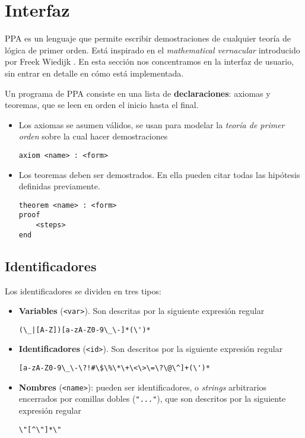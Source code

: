\section{Interfaz}

PPA es un lenguaje que permite escribir demostraciones de cualquier teoría de
lógica de primer orden. Está inspirado en el \textit{mathematical vernacular}
introducido por Freek Wiedijk \cite{freek-mv}. En esta sección nos
concentramos en la interfaz de usuario, sin entrar en detalle en cómo está
implementada.

Un programa de PPA consiste en una lista de \textbf{declaraciones}: axiomas y
teoremas, que se leen en orden el inicio hasta el final.

\begin{itemize}
    \item Los axiomas se asumen válidos, se usan para modelar la \textit{teoría
    de primer orden} sobre la cual hacer demostraciones

    \begin{lstlisting}[numbers=none]
axiom <name> : <form>
    \end{lstlisting}

    \item Los teoremas deben ser demostrados. En ella pueden citar
    todas las hipótesis definidas previamente.

    \begin{lstlisting}[numbers=none]
theorem <name> : <form>
proof
    <steps>
end
    \end{lstlisting}
\end{itemize}

\subsection{Identificadores}

Los identificadores se dividen en tres tipos:

\begin{itemize}
    \item \textbf{Variables} (\lstinline{<var>}). Son descritas por la siguiente
    expresión regular
    \begin{center}
        \verb/(\_|[A-Z])[a-zA-Z0-9\_\-]*(\')*/
    \end{center}
    \item \textbf{Identificadores} (\lstinline{<id>}). Son descritos por la
    siguiente expresión regular
    \begin{center}
        \verb/[a-zA-Z0-9\_\-\?!#\$\%\*\+\<\>\=\?\@\^]+(\')*/
    \end{center}
    \item \textbf{Nombres} (\lstinline{<name>}): pueden ser identificadores, o
    \textit{strings} arbitrarios encerrados por comillas dobles
    (\texttt{"..."}), que son descritos por la siguiente expresión regular
    \begin{center}
        \verb/\"[^\"]*\"/
    \end{center}
\end{itemize}

